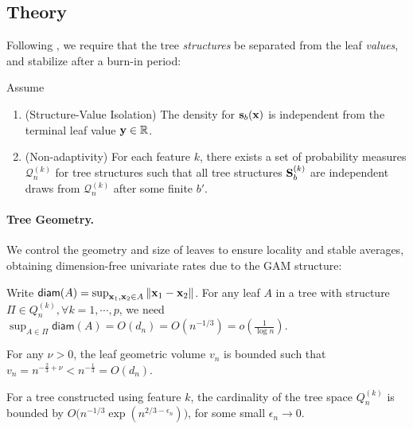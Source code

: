     \subsection{Theory}
    \label{ch06b:sec:theory}
	Following \cite{zhou2022boulevard, fang2025statistical}, we require that the tree \emph{structures} be separated from the leaf  \emph{values}, and stabilize after a burn-in period:
	\begin{assumption}[Integrity]
		\label{aspt:integrity}
		Assume
        \vspace{-2ex}
		\begin{enumerate}
			\item (Structure-Value Isolation) The density for $\mathbf{s}_b(\mathbf{x})$ is independent from the terminal leaf value $\mathbf{y}\in\mathbb{R}$.
			\item (Non-adaptivity) For each feature $k$, there exists a set of probability measures $\mathcal{Q}^{(k)}_n$ for tree structures such that all tree structures $\mathbf{S}^{(k)}_b$ are independent draws from $\mathcal{Q}^{(k)}_n$ after some finite $b'$.
		\end{enumerate}
	\end{assumption}
	
	\paragraph{Tree Geometry.}
	We control the geometry and size of leaves to ensure locality and stable averages, obtaining dimension-free univariate rates due to the GAM structure:
	\begin{assumption}
		\label{ch06b:aspt:leaf-diameter}
		Write $\mathsf{diam}(A)=\sup_{\mathbf{x}_1,\mathbf{x}_2\in A}\left\|\mathbf{x}_1-\mathbf{x}_2\right\|$. For any leaf $A$ in a tree with structure $\Pi\in Q_n^{(k)}, \forall k = 1, \cdots, p$, we need $\sup_{A \in \Pi} \mathsf{diam}(A) =  O(d_n) = O(n^{-{1}/{3}})=o(\frac{1}{\log n})$.
	\end{assumption}
	\vspace{-1ex}
	\begin{assumption}
		\label{ch06b:aspt:ub-minimal-leaf-size}
		For any $\nu >0$, the leaf geometric volume $v_n$ is bounded such that \(v_n =n^{-\frac{2}{3}+\nu}<n^{-\frac{1}{3}}=O(d_n)\).
	\end{assumption}
	\begin{assumption}
		\label{ch06b:aspt:restricted-tree-space}
		For a tree constructed using feature $k$, the cardinality of the tree space $Q_n^{(k)}$ is bounded by $O\Big(n^{-1/3}\exp(n^{2/3-\epsilon_n})\Big)$, for some small $\epsilon_n \to 0$.
	\end{assumption}

